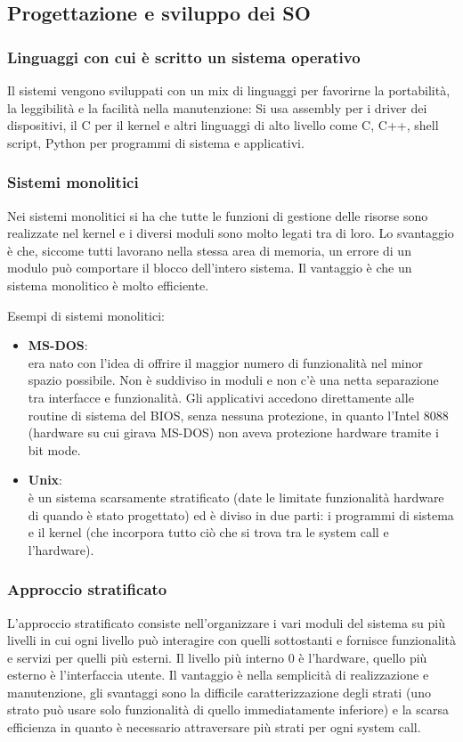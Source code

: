 \documentclass[a4paper]{article}
\begin{document}
\subsection{Progettazione e sviluppo dei SO}
\subsubsection*{Linguaggi con cui è scritto un sistema operativo}
Il sistemi vengono sviluppati con un mix di linguaggi per favorirne la portabilità, la leggibilità e la facilità nella manutenzione:
Si usa assembly per i driver dei dispositivi, il C per il kernel e altri linguaggi di alto livello come C, C++, shell script, Python
per programmi di sistema e applicativi.

\subsubsection*{Sistemi monolitici}
Nei sistemi monolitici si ha che tutte le funzioni di gestione delle risorse sono realizzate nel kernel e i diversi moduli
sono molto legati tra di loro. Lo svantaggio è che, siccome tutti lavorano nella stessa area di memoria, un errore di un
modulo può comportare il blocco dell'intero sistema. Il vantaggio è che un sistema monolitico è molto efficiente.

\noindent
Esempi di sistemi monolitici:
\begin{itemize}
	\item \textbf{MS-DOS}: \\
	era nato con l'idea di offrire il maggior numero di funzionalità nel minor spazio possibile. Non è suddiviso in moduli e non
	c'è una netta separazione tra interfacce e funzionalità. Gli applicativi accedono direttamente alle routine di sistema del
	BIOS, senza nessuna protezione, in quanto l'Intel 8088 (hardware su cui girava MS-DOS) non aveva protezione hardware tramite
	i bit mode.
	\item \textbf{Unix}: \\
	è un sistema scarsamente stratificato (date le limitate funzionalità hardware di quando è stato progettato) ed è diviso in
	due parti: i programmi di sistema e il kernel (che incorpora tutto ciò che si trova tra le system call e l'hardware).
\end{itemize}

\subsubsection*{Approccio stratificato}
L'approccio stratificato consiste nell'organizzare i vari moduli del sistema su più livelli in cui ogni livello può interagire
con quelli sottostanti e fornisce funzionalità e servizi per quelli più esterni. Il livello più interno 0 è l'hardware, quello
più esterno è l'interfaccia utente. Il vantaggio è nella semplicità di realizzazione e manutenzione, gli svantaggi sono la
difficile caratterizzazione degli strati (uno strato può usare solo funzionalità di quello immediatamente inferiore) e la scarsa
efficienza in quanto è necessario attraversare più strati per ogni system call.
\end{document}
